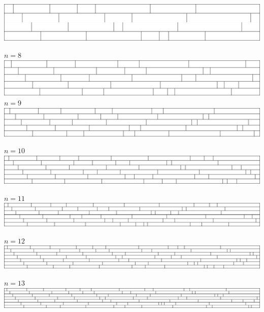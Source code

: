 \includegraphics[width=\textwidth]{../solutions/7}
\par\vspace{1em}
$n = 8$\\
\includegraphics[width=\textwidth]{../solutions/8}
\newpage
$n = 9$\\
\includegraphics[width=\textwidth]{../solutions/9}
\par\vspace{1em}
$n = 10$\\
\includegraphics[width=\textwidth]{../solutions/10}
\par\vspace{1em}
$n = 11$\\
\includegraphics[width=\textwidth]{../solutions/11}
\par\vspace{1em}
$n = 12$\\
\includegraphics[width=\textwidth]{../solutions/12}
\par\vspace{1em}
$n = 13$\\
\includegraphics[width=\textwidth]{../solutions/13}
\par\vspace{1em}
